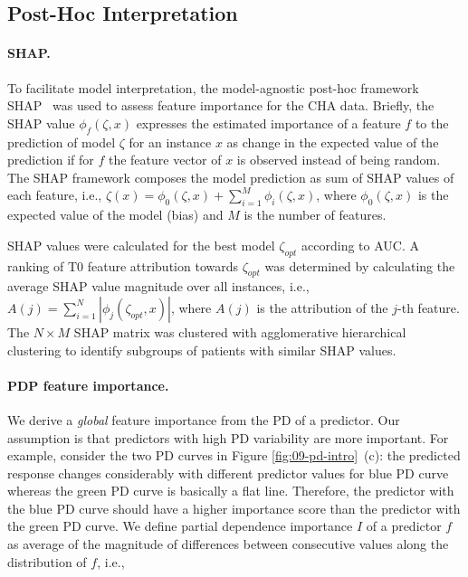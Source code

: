 \documentclass[
  oneside]{book}
\begin{document}
\hypertarget{post-hoc-interpretation}{%
\subsection{Post-Hoc Interpretation}\label{post-hoc-interpretation}}

\paragraph*{SHAP.}

To facilitate model interpretation, the model-agnostic post-hoc framework SHAP~\autocite{Lundberg:SHAP2017,Lundberg:TreeSHAP2019} was used to assess feature importance for the CHA data.
Briefly, the SHAP value \(\phi_f(\zeta,x)\) expresses the estimated importance of a feature \(f\) to the prediction of model \(\zeta\) for an instance \(x\) as change in the expected value of the prediction if for \(f\) the feature vector of \(x\) is observed instead of being random.
The SHAP framework composes the model prediction as sum of SHAP values of each feature, i.e., \(\zeta(x)=\phi_0(\zeta,x)+\sum_{i=1}^M \phi_i(\zeta,x)\), where \(\phi_0(\zeta,x)\) is the expected value of the model (bias) and \(M\) is the number of features.

SHAP values were calculated for the best model \(\zeta_{opt}\) according to AUC.
A ranking of T0 feature attribution towards \(\zeta_{opt}\) was determined by calculating the average SHAP value magnitude over all instances, i.e., \(A(j)=\sum_{i=1}^N |\phi_j(\zeta_{opt},x)|\),
where \(A(j)\) is the attribution of the \(j\)-th feature.
The \(N\times M\) SHAP matrix was clustered with agglomerative hierarchical clustering to identify subgroups of patients with similar SHAP values.

\paragraph*{PDP feature importance.}

We derive a \emph{global} feature importance from the PD of a predictor.
Our assumption is that predictors with high PD variability are more important.
For example, consider the two PD curves in Figure \ref{fig:09-pd-intro}~(c): the predicted response changes considerably with different predictor values for blue PD curve whereas the green PD curve is basically a flat line.
Therefore, the predictor with the blue PD curve should have a higher importance score than the predictor with the green PD curve.
We define partial dependence importance \(I\) of a predictor \(f\) as average of the magnitude of differences between consecutive values along the distribution of \(f\), i.e.,
\end{document}

